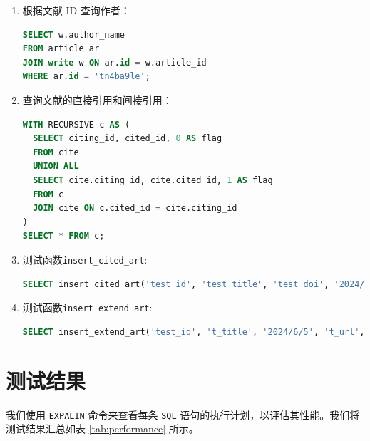 \documentclass[UTF8,openany]{ctexbook}
\begin{document}
\begin{enumerate}[label=\textbf{\arabic*}]
  \item 根据文献 ID 查询作者：
  \begin{lstlisting}[language=sql]
SELECT w.author_name
FROM article ar
JOIN write w ON ar.id = w.article_id
WHERE ar.id = 'tn4ba9le';
  \end{lstlisting}

  \item 查询文献的直接引用和间接引用：
  \begin{lstlisting}[language=sql]
WITH RECURSIVE c AS (
  SELECT citing_id, cited_id, 0 AS flag
  FROM cite
  UNION ALL
  SELECT cite.citing_id, cite.cited_id, 1 AS flag
  FROM c
  JOIN cite ON c.cited_id = cite.citing_id
)
SELECT * FROM c;
  \end{lstlisting}

  \item 测试函数\texttt{insert\_cited\_art}:
  \begin{lstlisting}[language=sql]
SELECT insert_cited_art('test_id', 'test_title', 'test_doi', '2024/6/5', 'test_journal', 'test_volume', 'test_in_pages', '0;1');
  \end{lstlisting}

  \item 测试函数\texttt{insert\_extend\_art}:
  \begin{lstlisting}[language=sql]
SELECT insert_extend_art('test_id', 't_title', '2024/6/5', 't_url', 't_type', 't_addr', 't_cha', 't_focus', 't_journal');
  \end{lstlisting}
\end{enumerate}

\section{测试结果}

我们使用 \texttt{EXPALIN} 命令来查看每条 \texttt{SQL} 语句的执行计划，以评估其性能。我们将测试结果汇总如表 \ref{tab:performance} 所示。
\end{document}
